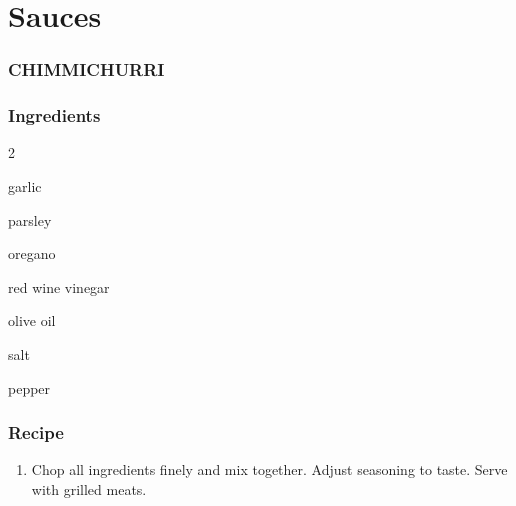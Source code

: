 \chapter{Sauces}
\begin{minipage}{0.98\textwidth}
\subsection*{CHIMMICHURRI}
\subsection*{Ingredients}
\begin{multicols}{2}
\begin{ingredients}
    \item garlic
    \item parsley
    \item oregano
    \item red wine vinegar
    \item olive oil
    \item salt
    \item pepper
\end{ingredients}
\end{multicols}
\subsection*{Recipe}
\begin{enumerate}
    \item Chop all ingredients finely and mix together. Adjust seasoning to taste. Serve with grilled meats.
\end{enumerate}

\end{minipage}
\vspace{4em}
